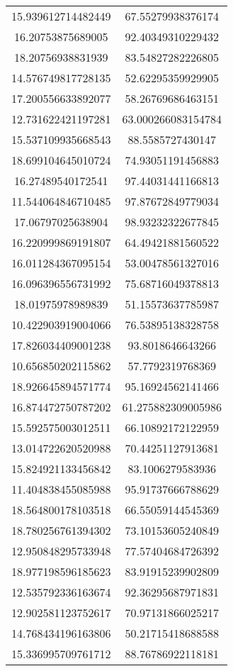 \begin{table}
\begin{tabular}{cc}
15.939612714482449 & 67.55279938376174 \\
16.20753875689005 & 92.40349310229432 \\
18.20756938831939 & 83.54827282226805 \\
14.576749817728135 & 52.62295359929905 \\
17.200556633892077 & 58.26769686463151 \\
12.731622421197281 & 63.000266083154784 \\
15.537109935668543 & 88.5585727430147 \\
18.699104645010724 & 74.93051191456883 \\
16.27489540172541 & 97.44031441166813 \\
11.544064846710485 & 97.87672849779034 \\
17.06797025638904 & 98.93232322677845 \\
16.220999869191807 & 64.49421881560522 \\
16.011284367095154 & 53.00478561327016 \\
16.096396556731992 & 75.68716049378813 \\
18.01975978989839 & 51.15573637785987 \\
10.422903919004066 & 76.53895138328758 \\
17.826034409001238 & 93.8018646643266 \\
10.656850202115862 & 57.7792319768369 \\
18.926645894571774 & 95.16924562141466 \\
16.874472750787202 & 61.275882309005986 \\
15.592575003012511 & 66.10892172122959 \\
13.014722620520988 & 70.44251127913681 \\
15.824921133456842 & 83.1006279583936 \\
11.404838455085988 & 95.91737666788629 \\
18.564800178103518 & 66.55059144545369 \\
18.780256761394302 & 73.10153605240849 \\
12.950848295733948 & 77.57404684726392 \\
18.977198596185623 & 83.91915239902809 \\
12.535792336163674 & 92.36295687971831 \\
12.902581123752617 & 70.97131866025217 \\
14.768434196163806 & 50.21715418688588 \\
15.336995709761712 & 88.76786922118181 \\

\end{tabular}
\end{table}
